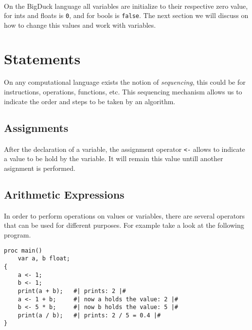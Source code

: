 \paragraph{} On the BigDuck language all variables are initialize to their
respective zero value, for ints and floats is \texttt{0}, and for bools is
\texttt{false}. The next section we will discuss on how to change this values
and work with variables.

\section{Statements}

\paragraph{} On any computational language exists the notion of
\emph{sequencing}, this could be for instructions, operations, functions, etc.
This sequencing mechanism allows us to indicate the order and steps to be taken
by an algorithm.

\subsection{Assignments}

\paragraph{} After the declaration of a variable, the assignment operator
\texttt{<-} allows to indicate a value to be hold by the variable. It will
remain this value untill another asignment is performed.

\subsection{Arithmetic Expressions}

\paragraph{} In order to perform operations on values or variables, there are
several operators that can be used for different purposes. For example take a
look at the following program.

\begin{verbatim}
proc main()
    var a, b float;
{
    a <- 1;
    b <- 1;
    print(a + b);   #| prints: 2 |#
    a <- 1 + b;     #| now a holds the value: 2 |#
    b <- 5 * b;     #| now b holds the value: 5 |#
    print(a / b);   #| prints: 2 / 5 = 0.4 |#
}
\end{verbatim}

